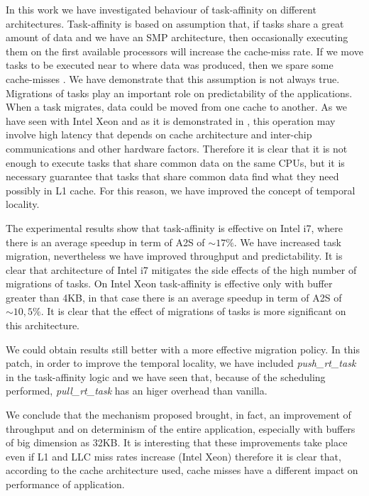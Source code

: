 In this work we have investigated behaviour of task-affinity on different architectures. Task-affinity is based on assumption that, if tasks share a great 
amount of data and we have an SMP architecture, then occasionally executing them on the first available processors will increase the cache-miss rate. If we 
move tasks to be executed near to where data was produced, then we spare some cache-misses \cite{lcs}. We have demonstrate that this assumption is not 
always true. Migrations of tasks play an important role on predictability of the applications. When a task migrates, data could be moved from one cache to 
another. As we have seen with Intel Xeon and as it is demonstrated in \cite{molka}, this operation may involve high latency that depends on cache 
architecture and inter-chip communications and other hardware factors. Therefore it is clear that it is not enough to execute tasks that share common data 
on the same CPUs, but it is necessary guarantee that tasks that share common data find what they need possibly in L1 cache. For this reason, we have 
improved the concept of temporal locality.

The experimental results show that task-affinity is effective on Intel i7, where there is an average speedup in term of A2S of $\sim 17\%$. We have 
increased task migration, nevertheless we have improved throughput and predictability. It is clear that architecture of Intel i7 mitigates the side effects 
of the high number of migrations of tasks. On Intel Xeon task-affinity is effective only with buffer greater than 4KB, in that case there is an average 
speedup in term of A2S of $\sim 10,5\%$. It is clear that the effect of migrations of tasks is more significant on this architecture.

We could obtain results still better with a more effective migration policy. In this patch, in order to improve the temporal locality, we have included 
\textit{push\_rt\_task} in the task-affinity logic and we have seen that, because of the scheduling performed, \textit{pull\_rt\_task} has an higer overhead
than vanilla. 

We conclude that the mechanism proposed brought, in fact, an improvement of throughput and on determinism of the entire application, especially with buffers
of big dimension as 32KB. It is interesting that these improvements take place even if L1 and LLC miss rates increase (Intel Xeon) therefore it is clear
that, according to the cache architecture used, cache misses have a different impact on performance of application.



